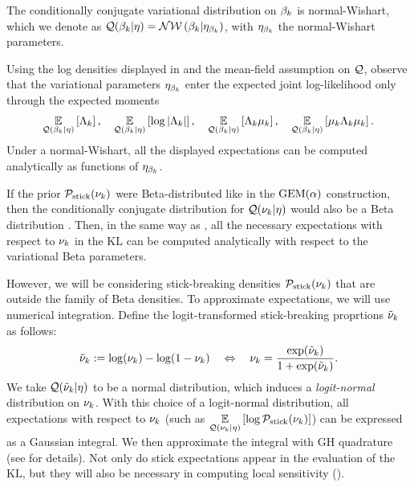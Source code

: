 \begin{ex}
%
The conditionally conjugate variational distribution on $\beta_k$ is
normal-Wishart, which we denote as
$\mathcal{Q}(\beta_k \vert \eta) = \mathcal{N}\mathcal{W}\left(\beta_k \vert \eta_{\beta_k}\right)$,
with $\eta_{\beta_k}$ the normal-Wishart parameters.

Using the log densities displayed in 
and the mean-field assumption on $\mathcal{Q}$,
observe that the variational parameters $\eta_{\beta_k}$
enter the expected joint log-likelihood only through the
expected moments
%
\begin{align*}
\underset{\mathcal{Q}(\beta_k \vert \eta)}{\mathbb{E}}\left[\Lambda_k\right],  \quad
\underset{\mathcal{Q}(\beta_k \vert \eta)}{\mathbb{E}}\left[\log|\Lambda_k|\right],  \quad
\underset{\mathcal{Q}(\beta_k \vert \eta)}{\mathbb{E}}\left[\Lambda_k\mu_k\right], \quad
\underset{\mathcal{Q}(\beta_k \vert \eta)}{\mathbb{E}}\left[\mu_k\Lambda_k\mu_k\right].
\end{align*}
Under a normal-Wishart, all the displayed expectations
can be computed analytically as functions of $\eta_{\beta_k}$.
%
\end{ex}

If the prior $\mathcal{P}_{\mathrm{stick}}(\nu_{k})$ were Beta-distributed like in the $\mathrm{GEM}(\alpha)$
construction, then the conditionally conjugate distribution for $\mathcal{Q}(\nu_{k} \vert
\eta)$ would also be a Beta distribution \citep{blei:2006:vi_for_dp}. Then, in
the same way as , all the necessary expectations with
respect to $\nu_{k}$ in the $\mathrm{KL}$ can be computed analytically with respect
to the variational Beta parameters.

However, we will be considering stick-breaking densities $\mathcal{P}_{\mathrm{stick}}(\nu_{k})$
that are outside the family of Beta densities. To approximate expectations,
we will use numerical integration.  Define the logit-transformed stick-breaking
proprtions $\tilde{\nu}_{k}$ as follows:
%
\begin{align*}
  \tilde{\nu}_k := \log(\nu_k) - \log(1 - \nu_k)
  \quad \Leftrightarrow \quad
  \nu_{k} = \frac{\exp(\tilde{\nu}_k)}{1 + \exp(\tilde{\nu}_k)}.
\end{align*}
%
We take $\mathcal{Q}(\tilde{\nu}_{k} \vert \eta)$ to be a normal distribution, which induces a
\textit{logit-normal} distribution on $\nu_{k}$. With this choice of a logit-normal
distribution, all expectations with respect to $\nu_k$ (such as
$\underset{\mathcal{Q}(\nu_k\vert\eta)}{\mathbb{E}}\left[\log \mathcal{P}_{\mathrm{stick}}(\nu_k)\right]$) can be expressed as a
Gaussian integral. We then approximate the integral with GH quadrature (see
 for details). Not only do stick expectations appear in
the evaluation of the $\mathrm{KL}$, but they will also be necessary in
computing local sensitivity ().

